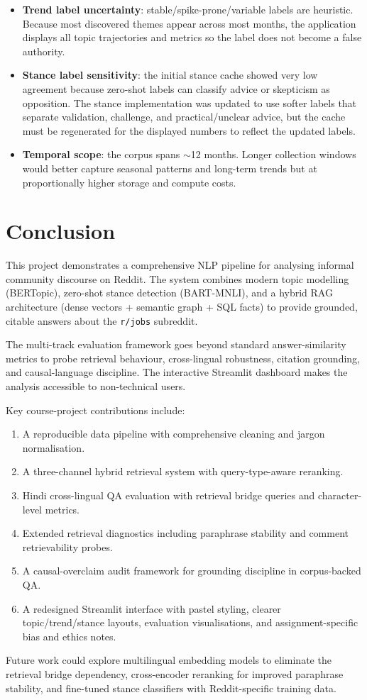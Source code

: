 \documentclass[11pt,a4paper]{article}
\begin{document}
\begin{itemize}[leftmargin=*]
  \item \textbf{Trend label uncertainty}: stable/spike-prone/variable labels are heuristic. Because most discovered themes appear across most months, the application displays all topic trajectories and metrics so the label does not become a false authority.

  \item \textbf{Stance label sensitivity}: the initial stance cache showed very low agreement because zero-shot labels can classify advice or skepticism as opposition. The stance implementation was updated to use softer labels that separate validation, challenge, and practical/unclear advice, but the cache must be regenerated for the displayed numbers to reflect the updated labels.
  
  \item \textbf{Temporal scope}: the corpus spans $\sim$12 months. Longer collection windows would better capture seasonal patterns and long-term trends but at proportionally higher storage and compute costs.
\end{itemize}


\section{Conclusion}
\label{sec:conclusion}

This project demonstrates a comprehensive NLP pipeline for analysing informal community discourse on Reddit. The system combines modern topic modelling (BERTopic), zero-shot stance detection (BART-MNLI), and a hybrid RAG architecture (dense vectors + semantic graph + SQL facts) to provide grounded, citable answers about the \texttt{r/jobs} subreddit.

The multi-track evaluation framework goes beyond standard answer-similarity metrics to probe retrieval behaviour, cross-lingual robustness, citation grounding, and causal-language discipline. The interactive Streamlit dashboard makes the analysis accessible to non-technical users.

Key course-project contributions include:
\begin{enumerate}[leftmargin=*]
  \item A reproducible data pipeline with comprehensive cleaning and jargon normalisation.
  \item A three-channel hybrid retrieval system with query-type-aware reranking.
  \item Hindi cross-lingual QA evaluation with retrieval bridge queries and character-level metrics.
  \item Extended retrieval diagnostics including paraphrase stability and comment retrievability probes.
  \item A causal-overclaim audit framework for grounding discipline in corpus-backed QA.
  \item A redesigned Streamlit interface with pastel styling, clearer topic/trend/stance layouts, evaluation visualisations, and assignment-specific bias and ethics notes.
\end{enumerate}

Future work could explore multilingual embedding models to eliminate the retrieval bridge dependency, cross-encoder reranking for improved paraphrase stability, and fine-tuned stance classifiers with Reddit-specific training data.
\end{document}
